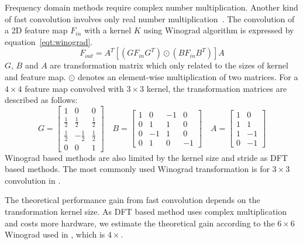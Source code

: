 Frequency domain methods require complex number multiplication. Another kind of fast convolution involves only real number multiplication~\cite{winograd1980arithmetic}. The convolution of a 2D feature map $F_{in}$ with a kernel $K$ using Winograd algorithm is expressed by equation~\ref{eqt:winograd}.
\begin{equation}\label{eqt:winograd}
    F_{out} = A^T[(GF_{in}G^T)\odot(BF_{in}B^T)]A
\end{equation}
$G$, $B$ and $A$ are transformation matrix which only related to the sizes of kernel and feature map. $\odot$ denotes an element-wise multiplication of two matrices. For a $4\times 4$ feature map convolved with $3\times 3$ kernel, the transformation matrices are described as follows:
\begin{equation*}
    G = \left[
        \begin{array}{ccc}
            1           & 0            & 0           \\
            \frac{1}{2} & \frac{1}{2}  & \frac{1}{2} \\
            \frac{1}{2} & -\frac{1}{2} & \frac{1}{2} \\
            0           & 0            & 1
        \end{array}    
    \right] \quad
    B = \left[
        \begin{array}{cccc}
            1 & 0  & -1 & 0 \\
            0 & 1  & 1  & 0 \\
            0 & -1 & 1  & 0 \\
            0 & 1  & 0  & -1
        \end{array}
    \right] \quad
    A = \left[
        \begin{array}{cc}
            1 & 0  \\
            1 & 1  \\
            1 & -1 \\
            0 & -1 
        \end{array}
    \right]
\end{equation*}
Winograd based methods are also limited by the kernel size and stride as DFT based methods. The most commonly used Winograd transformation is for $3\times 3$ convolution in \cite{lu2017evaluating, xiao2017exploring}.

The theoretical performance gain from fast convolution depends on the transformation kernel size. As DFT based method uses complex multiplication and costs more hardware, we estimate the theoretical gain according to the $6\times6$ Winograd used in \cite{lu2017evaluating}, which is $4\times$.

